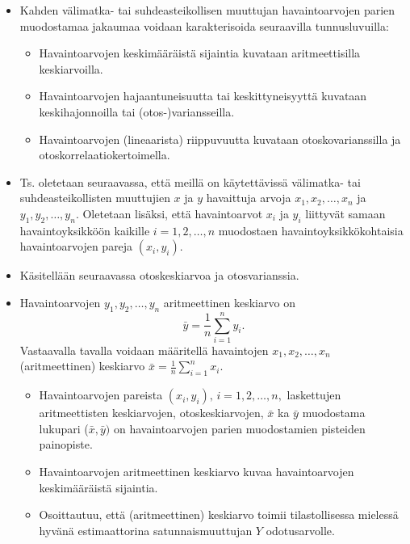 \documentclass[
]{book}
\providecommand{\tightlist}{%
  \setlength{\itemsep}{0pt}\setlength{\parskip}{0pt}}
\begin{document}
\begin{itemize}
\item
  Kahden välimatka- tai suhdeasteikollisen muuttujan havaintoarvojen parien muodostamaa jakaumaa voidaan karakterisoida seuraavilla tunnusluvuilla:

  \begin{itemize}
  \tightlist
  \item
    Havaintoarvojen keskimääräistä sijaintia kuvataan aritmeettisilla keskiarvoilla.
  \item
    Havaintoarvojen hajaantuneisuutta tai keskittyneisyyttä kuvataan keskihajonnoilla tai (otos-)variansseilla.
  \item
    Havaintoarvojen (lineaarista) riippuvuutta kuvataan otoskovarianssilla ja otoskorrelaatiokertoimella.
  \end{itemize}
\item
  Ts. oletetaan seuraavassa, että meillä on käytettävissä välimatka- tai suhdeasteikollisten muuttujien \(x\) ja \(y\) havaittuja arvoja \(x_1, x_2, \ldots, x_n\) ja \(y_1, y_2, \ldots, y_n\). Oletetaan lisäksi, että havaintoarvot \(x_i\) ja \(y_i\) liittyvät samaan havaintoyksikköön kaikille \(i = 1, 2, \ldots, n\) muodostaen havaintoyksikkökohtaisia havaintoarvojen pareja \((x_i, y_i)\).
\item
  Käsitellään seuraavassa otoskeskiarvoa ja otosvarianssia.
\item
  Havaintoarvojen \(y_1, y_2,\ldots, y_n\) aritmeettinen keskiarvo on
  \[
    \bar{y} = \frac{1}{n} \sum_{i=1}^{n} y_i.
  \]
  Vastaavalla tavalla voidaan määritellä havaintojen \(x_1, x_2, \ldots, x_n\) (aritmeettinen) keskiarvo \(\bar{x}=\frac{1}{n}\sum_{i=1}^{n}x_i\).

  \begin{itemize}
  \tightlist
  \item
    Havaintoarvojen pareista \((x_i, y_i ), \, i = 1, 2,\ldots,n,\) laskettujen aritmeettisten keskiarvojen, otoskeskiarvojen, \(\bar{x}\) ka \(\bar{y}\) muodostama lukupari (\(\bar{x}, \bar{y})\) on havaintoarvojen parien muodostamien pisteiden painopiste.
  \item
    Havaintoarvojen aritmeettinen keskiarvo kuvaa havaintoarvojen keskimääräistä sijaintia.
  \item
    Osoittautuu, että (aritmeettinen) keskiarvo toimii tilastollisessa mielessä hyvänä estimaattorina satunnaismuuttujan \(Y\) odotusarvolle.
  \end{itemize}
\end{itemize}
\end{document}
